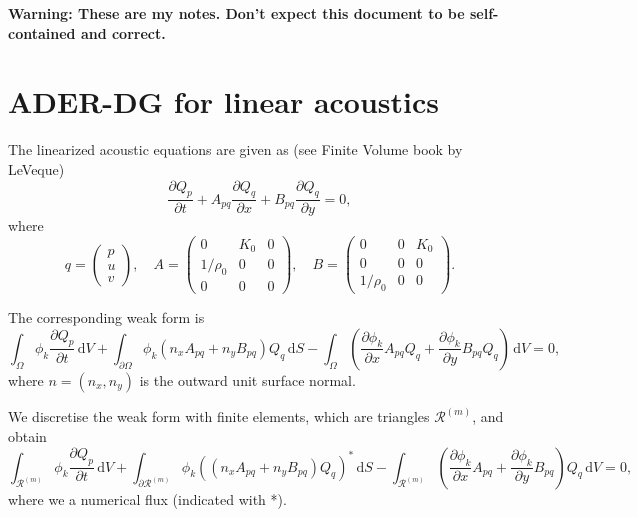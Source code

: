 \documentclass[a4paper]{scrartcl}
\newcommand{\dd}[1]{\,\mathrm{d}#1}
\begin{document}
\textbf{\Huge Warning: These are my notes. Don't expect this document to be self-contained and correct.}

\section{ADER-DG for linear acoustics}
The linearized acoustic equations are given as (see Finite Volume book by LeVeque)
\begin{equation}\label{eq:pde}
 \frac{\partial Q_p}{\partial t} + A_{pq}\frac{\partial Q_q}{\partial x} + B_{pq}\frac{\partial Q_q}{\partial y} = 0,
\end{equation}
where
\begin{equation}
 q = \begin{pmatrix}p \\ u \\ v\end{pmatrix}, \quad
 A = \begin{pmatrix}0 & K_0 & 0 \\ 1/\rho_0 & 0 & 0 \\ 0 & 0 & 0 \end{pmatrix}, \quad
 B = \begin{pmatrix}0 & 0 & K_0 \\ 0 & 0 & 0 \\ 1/\rho_0 & 0 & 0 \end{pmatrix}.
\end{equation}

The corresponding weak form is
\begin{equation}
 \int_{\Omega}\phi_k\frac{\partial Q_p}{\partial t}\dd{V} +
 \int_{\partial\Omega}\phi_k \left(n_xA_{pq} + n_yB_{pq}\right)Q_q\dd{S} -
 \int_{\Omega}\left(\frac{\partial \phi_k}{\partial x}A_{pq}Q_q + \frac{\partial \phi_k}{\partial y}B_{pq}Q_q\right)\dd{V} = 0,
\end{equation}
where $n=(n_x,n_y)$ is the outward unit surface normal.

We discretise the weak form with finite elements, which are triangles $\mathcal R^{(m)}$, and obtain
\begin{equation}
 \int_{\mathcal R^{(m)}}\phi_k\frac{\partial Q_p}{\partial t}\dd{V} +
 \int_{\partial\mathcal R^{(m)}}\phi_k \left(\left(n_xA_{pq} + n_yB_{pq}\right)Q_q\right)^*\dd{S} -
 \int_{\mathcal R^{(m)}}\left(\frac{\partial \phi_k}{\partial x}A_{pq} + \frac{\partial \phi_k}{\partial y}B_{pq}\right)Q_q\dd{V} = 0,
\end{equation}
where we a numerical flux (indicated with *).
\end{document}

